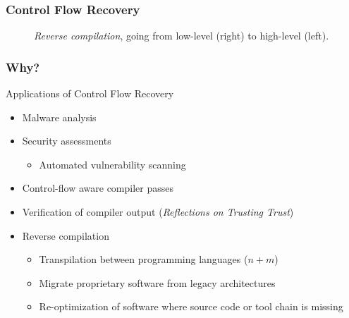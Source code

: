 \documentclass[aspectratio=1610]{beamer}
\begin{document}
\begin{frame}
	\frametitle{Control Flow Recovery}

	\begin{figure}[htbp]
		\centering
		\begin{subfigure}[t]{0.27\textwidth}
			\centering
			
		\end{subfigure}
		\quad
		\begin{subfigure}[t]{0.52\textwidth}
			\centering
			
		\end{subfigure}
		\caption{\textit{Reverse compilation}, going from low-level (right) to high-level (left).}
	\end{figure}

\end{frame}




\begin{frame}
	\frametitle{Why?}

	\begin{block}{Applications of Control Flow Recovery}
		\begin{itemize}
			\item Malware analysis
			\item Security assessments
			\begin{itemize}
				\item Automated vulnerability scanning
			\end{itemize}
			\item Control-flow aware compiler passes
			\item Verification of compiler output (\textit{Reflections on Trusting Trust})
			\item Reverse compilation
			\begin{itemize}
				\item Transpilation between programming languages ($n + m$)
				\item Migrate proprietary software from legacy architectures
				\item Re-optimization of software where source code or tool chain is missing
			\end{itemize}
		\end{itemize}
	\end{block}
\end{frame}
\end{document}
